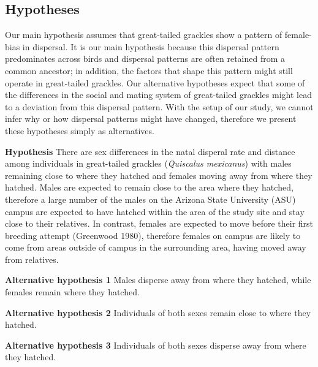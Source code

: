 \documentclass[]{article}
\begin{document}
\hypertarget{hypotheses}{%
\subsection{Hypotheses}\label{hypotheses}}

Our main hypothesis assumes that great-tailed grackles show a pattern of
female-bias in dispersal. It is our main hypothesis because this
dispersal pattern predominates across birds and dispersal patterns are
often retained from a common ancestor; in addition, the factors that
shape this pattern might still operate in great-tailed grackles. Our
alternative hypotheses expect that some of the differences in the social
and mating system of great-tailed grackles might lead to a deviation
from this dispersal pattern. With the setup of our study, we cannot
infer why or how dispersal patterns might have changed, therefore we
present these hypotheses simply as alternatives.

\textbf{Hypothesis} There are sex differences in the natal disperal rate
and distance among individuals in great-tailed grackles (\emph{Quiscalus
mexicanus}) with males remaining close to where they hatched and females
moving away from where they hatched. Males are expected to remain close
to the area where they hatched, therefore a large number of the males on
the Arizona State University (ASU) campus are expected to have hatched
within the area of the study site and stay close to their relatives. In
contrast, females are expected to move before their first breeding
attempt (Greenwood 1980), therefore females on campus are likely to come
from areas outside of campus in the surrounding area, having moved away
from relatives.

\textbf{Alternative hypothesis 1} Males disperse away from where they
hatched, while females remain where they hatched.

\textbf{Alternative hypothesis 2} Individuals of both sexes remain close
to where they hatched.

\textbf{Alternative hypothesis 3} Individuals of both sexes disperse
away from where they hatched.
\end{document}
